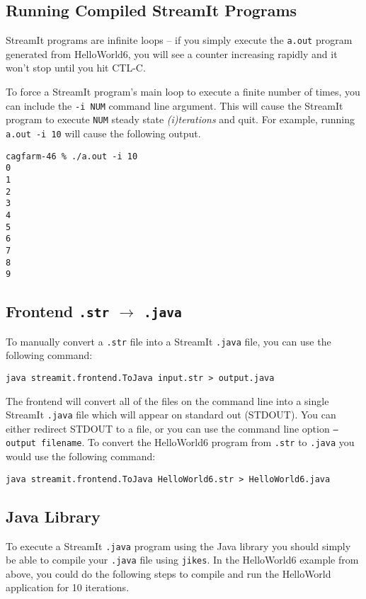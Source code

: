 \subsection{Running Compiled StreamIt Programs}
StreamIt programs are infinite loops -- if you simply execute the {\tt a.out} 
program generated from HelloWorld6, you will see a counter increasing 
rapidly and it won't stop until you hit CTL-C.

To force a StreamIt program's main loop to execute a finite number
of times, you can include the {\tt -i NUM} command line argument.
This will cause the StreamIt program to execute {\tt NUM} steady state
{\it (i)terations} and quit. For example, running {\tt a.out -i 10} will 
cause the following output.

\begin{verbatim}
cagfarm-46 % ./a.out -i 10
0
1
2
3
4
5
6
7
8
9
\end{verbatim}



\subsection{Frontend {\tt .str} $\rightarrow$ {\tt .java}}
To manually convert a {\tt .str} file into a StreamIt {\tt .java} 
file, you can use the following command:

\begin{verbatim}
java streamit.frontend.ToJava input.str > output.java
\end{verbatim}

The frontend will convert all of the files on the command line
into a single StreamIt {\tt .java} file which will appear on
standard out (STDOUT). You can either redirect STDOUT to a file, 
or you can use the command line option {\tt --output filename}.
To convert the HelloWorld6 program from {\tt .str} to {\tt .java}
you would use the following command:

\begin{verbatim}
java streamit.frontend.ToJava HelloWorld6.str > HelloWorld6.java
\end{verbatim}

\subsection{Java Library}
To execute a StreamIt {\tt .java} program using the Java library
you should simply be able to compile your {\tt .java} file using
{\tt jikes}. In the HelloWorld6 example from above,
you could do the following steps to compile and run the HelloWorld
application for 10 iterations.

